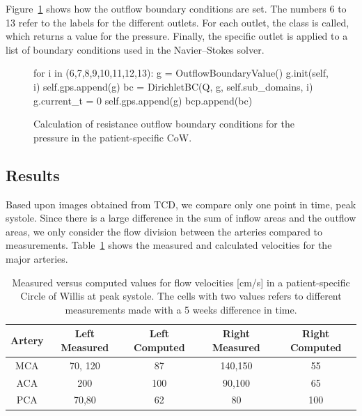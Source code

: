 Figure~\ref{fig:outflow_code} shows how the outflow boundary
conditions are set. The numbers 6 to 13 refer to the labels for the
different outlets. For each outlet, the class
 is called, which returns a value for the
pressure. Finally, the specific outlet is applied to a list of
boundary conditions used in the Navier--Stokes solver.

\begin{figure}
  \begin{center}
    \begin{python}
for i in (6,7,8,9,10,11,12,13):
	g = OutflowBoundaryValue()
	g.init(self, i)
	self.gps.append(g)
	bc = DirichletBC(Q, g, self.sub_domains, i)
	g.current_t = 0
	self.gps.append(g)
	bcp.append(bc)
    \end{python}
    \caption{Calculation of resistance outflow boundary conditions for
      the pressure in the patient-specific CoW.}
    \label{fig:outflow_code}
  \end{center}
\end{figure}

\subsection{Results}

Based upon images obtained from TCD, we compare only one point in
time, peak systole. Since there is a large difference in the sum of
inflow areas and the outflow areas, we only consider the flow division
between the arteries compared to measurements.
Table~\ref{measure_vs_comp} shows the measured and calculated
velocities for the major arteries.

\begin{table}
  \begin{tabular}  {  c | c | c | c | c }
    Artery & Left Measured & Left Computed & Right Measured & Right Computed \\
    \hline
    MCA & 70, 120 		& 87  & 140,150 	& 55	\\
    ACA & 200  		& 100  	& 90,100 	& 65	\\
    PCA & 70,80  		& 62 	& 80  		& 100  \\
    \hline
  \end{tabular}
  \caption{Measured versus computed values for flow velocities [cm/s]
    in a patient-specific Circle of Willis at peak systole. The cells
    with two values refers to different measurements made with a 5
    weeks difference in time.}
  \label{measure_vs_comp}
\end{table}

